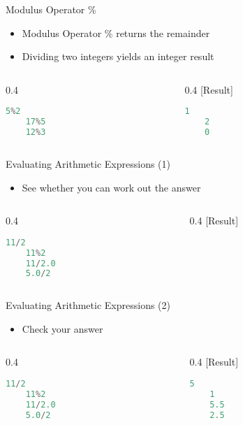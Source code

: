 \begin{frame}[fragile]{Modulus Operator \%}
\begin{itemize}
	\item {Modulus Operator \% returns the remainder}
	\item {Dividing two integers yields an integer result}
\end{itemize}
\begin{columns}
\begin{column}{0.4\linewidth}
	\begin{lstlisting}[numbers=none, language=c]
	5%2
	17%5
	12%3
	\end{lstlisting}
\end{column}
\begin{column}{0.4\linewidth}
[Result]
	\begin{lstlisting}[numbers=none, language=c]
	1
	2
	0
	\end{lstlisting}
\end{column}
\end{columns}
\end{frame}

\begin{frame}[fragile]{Evaluating Arithmetic Expressions (1)}
\begin{itemize}
	\item {See whether you can work out the answer}
\end{itemize}
\begin{columns}
\begin{column}{0.4\linewidth}
	\begin{lstlisting}[numbers=none, language=c]
	11/2
	11%2
	11/2.0
	5.0/2
	\end{lstlisting}
\end{column}
\begin{column}{0.4\linewidth}
[Result]
%
\end{column}
\end{columns}
\end{frame}


\begin{frame}[fragile]{Evaluating Arithmetic Expressions (2)}
\begin{itemize}
	\item {Check your answer}
\end{itemize}
\begin{columns}
\begin{column}{0.4\linewidth}
	\begin{lstlisting}[numbers=none, language=c]
	11/2
	11%2
	11/2.0
	5.0/2
	\end{lstlisting}
\end{column}
\begin{column}{0.4\linewidth}
[Result]
	\begin{lstlisting}[numbers=none, language=c]
	5
	1
	5.5
	2.5
	\end{lstlisting}
\end{column}
\end{columns}
\end{frame}


